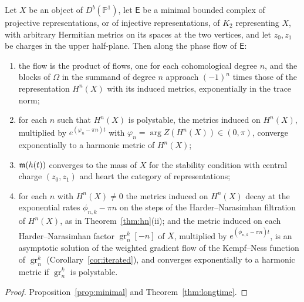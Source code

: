 \begin{theorem}\label{thm:P1}
Let $X$ be an object of $D^b(\mathbb P^1)$, let $\mathsf E$ be a minimal
bounded complex of projective representations, or of injective
representations, of $K_2$ representing $X$, with arbitrary Hermitian metrics
on its spaces at the two vertices, and let $z_0,z_1$ be charges in the upper
half-plane. Then along the phase flow of $\mathsf E$:
\begin{enumerate}
\item[(i)] the flow is the product of flows, one for each cohomological
 degree $n$, and the blocks of $\Omega$ in the summand of degree $n$ approach
 $(-1)^n$ times those of the representation $H^n(X)$ with its induced
 metrics, exponentially in the trace norm;
\item[(ii)] for each $n$ such that $H^n(X)$ is polystable, the metrics
 induced on $H^n(X)$, multiplied by $e^{(\varphi_n-\pi n)t}$ with
 $\varphi_n=\arg Z(H^n(X))\in(0,\pi)$, converge exponentially to a harmonic
 metric of $H^n(X)$;
\item[(iii)] $\mathfrak m(h(t))$ converges to the mass of $X$ for the stability
 condition with central charge $(z_0,z_1)$ and heart the category of
 representations;
\item[(iv)] for each $n$ with $H^n(X)\neq0$ the metrics induced on $H^n(X)$
 decay at the exponential rates $\phi_{n,k}-\pi n$ on the steps of the
 Harder--Narasimhan filtration of $H^n(X)$, as in
 Theorem~\ref{thm:hn}(ii); and the metric induced on each Harder--Narasimhan
 factor $\operatorname{gr}^k_n[-n]$ of $X$, multiplied by
 $e^{(\phi_{n,k}-\pi n)t}$, is an asymptotic solution of the weighted
 gradient flow of the Kempf--Ness function of $\operatorname{gr}^k_n$
 (Corollary~\ref{cor:iterated}), and converges exponentially to a harmonic
 metric if $\operatorname{gr}^k_n$ is polystable.
\end{enumerate}
\end{theorem}

\begin{proof}
Proposition~\ref{prop:minimal} and Theorem~\ref{thm:longtime}.
\end{proof}

